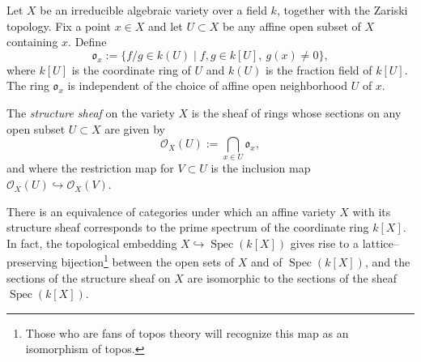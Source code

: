 \documentclass[12pt]{article}
\renewcommand{\o}{\mathfrak{o}}
\renewcommand{\O}{\mathcal{O}}
\begin{document}
Let $X$ be an irreducible algebraic variety over a field $k$, together with the Zariski topology. Fix a point $x \in X$ and let $U \subset X$ be any affine open subset of $X$ containing $x$. Define
$$
\o_x := \{f/g \in k(U) \mid f,g \in k[U],\ g(x) \neq 0\},
$$
where $k[U]$ is the coordinate ring of $U$ and $k(U)$ is the fraction field of $k[U]$. The ring $\o_x$ is independent of the choice of affine open neighborhood $U$ of $x$.

The {\em structure sheaf} on the variety $X$ is the sheaf of rings whose sections on any open subset $U \subset X$ are given by
$$
\O_X(U) := \bigcap_{x \in U} \o_x,
$$
and where the restriction map for $V \subset U$ is the inclusion map $\O_X(U) \hookrightarrow \O_X(V)$.

There is an equivalence of categories under which an affine variety $X$ with its structure sheaf corresponds to the prime spectrum of the coordinate ring $k[X]$. In fact, the topological embedding $X \hookrightarrow \operatorname{Spec}(k[X])$ gives rise to a lattice--preserving bijection\footnote{Those who are fans of topos theory will recognize this map as an isomorphism of topos.} between the open sets of $X$ and of $\operatorname{Spec}(k[X])$, and the sections of the structure sheaf on $X$ are isomorphic to the sections of the sheaf $\operatorname{Spec}(k[X])$.
\end{document}

